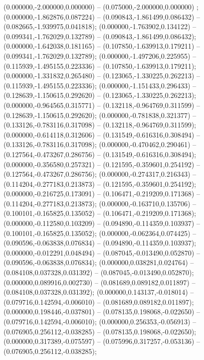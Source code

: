  (0.000000,-2.000000,0.000000) -- (0.075000,-2.000000,0.000000) ;
 (0.000000,-1.862876,0.087224) -- (0.090843,-1.861499,0.086432) -- (0.082665,-1.939975,0.041818);
 (0.000000,-1.763902,0.134122) -- (0.099341,-1.762029,0.132789) -- (0.090843,-1.861499,0.086432);
 (0.000000,-1.642038,0.181165) -- (0.107850,-1.639913,0.179211) -- (0.099341,-1.762029,0.132789);
 (0.000000,-1.497206,0.225955) -- (0.115939,-1.495155,0.223336) -- (0.107850,-1.639913,0.179211);
 (0.000000,-1.331832,0.265480) -- (0.123065,-1.330225,0.262213) -- (0.115939,-1.495155,0.223336);
 (0.000000,-1.151433,0.296433) -- (0.128639,-1.150615,0.292620) -- (0.123065,-1.330225,0.262213);
 (0.000000,-0.964565,0.315771) -- (0.132118,-0.964769,0.311599) -- (0.128639,-1.150615,0.292620);
 (0.000000,-0.781838,0.321377) -- (0.133126,-0.783116,0.317098) -- (0.132118,-0.964769,0.311599);
 (0.000000,-0.614118,0.312606) -- (0.131549,-0.616316,0.308494) -- (0.133126,-0.783116,0.317098);
 (0.000000,-0.470462,0.290461) -- (0.127564,-0.473267,0.286756) -- (0.131549,-0.616316,0.308494);
 (0.000000,-0.356580,0.257321) -- (0.121595,-0.359601,0.254192) -- (0.127564,-0.473267,0.286756);
 (0.000000,-0.274317,0.216343) -- (0.114204,-0.277183,0.213873) -- (0.121595,-0.359601,0.254192);
 (0.000000,-0.216725,0.173091) -- (0.106471,-0.219209,0.171368) -- (0.114204,-0.277183,0.213873);
 (0.000000,-0.163710,0.135706) -- (0.100101,-0.165825,0.135052) -- (0.106471,-0.219209,0.171368);
 (0.000000,-0.112580,0.103209) -- (0.094890,-0.114359,0.103937) -- (0.100101,-0.165825,0.135052);
 (0.000000,-0.062364,0.074425) -- (0.090596,-0.063838,0.076834) -- (0.094890,-0.114359,0.103937);
 (0.000000,-0.012291,0.048494) -- (0.087045,-0.013490,0.052870) -- (0.090596,-0.063838,0.076834);
 (0.000000,0.038281,0.024764) -- (0.084108,0.037328,0.031392) -- (0.087045,-0.013490,0.052870);
 (0.000000,0.089916,0.002730) -- (0.081689,0.089182,0.011897) -- (0.084108,0.037328,0.031392);
 (0.000000,0.143137,-0.018014) -- (0.079716,0.142594,-0.006010) -- (0.081689,0.089182,0.011897);
 (0.000000,0.198446,-0.037801) -- (0.078135,0.198068,-0.022650) -- (0.079716,0.142594,-0.006010);
 (0.000000,0.256353,-0.056913) -- (0.076905,0.256112,-0.038285) -- (0.078135,0.198068,-0.022650);
 (0.000000,0.317389,-0.075597) -- (0.075996,0.317257,-0.053136) -- (0.076905,0.256112,-0.038285);
